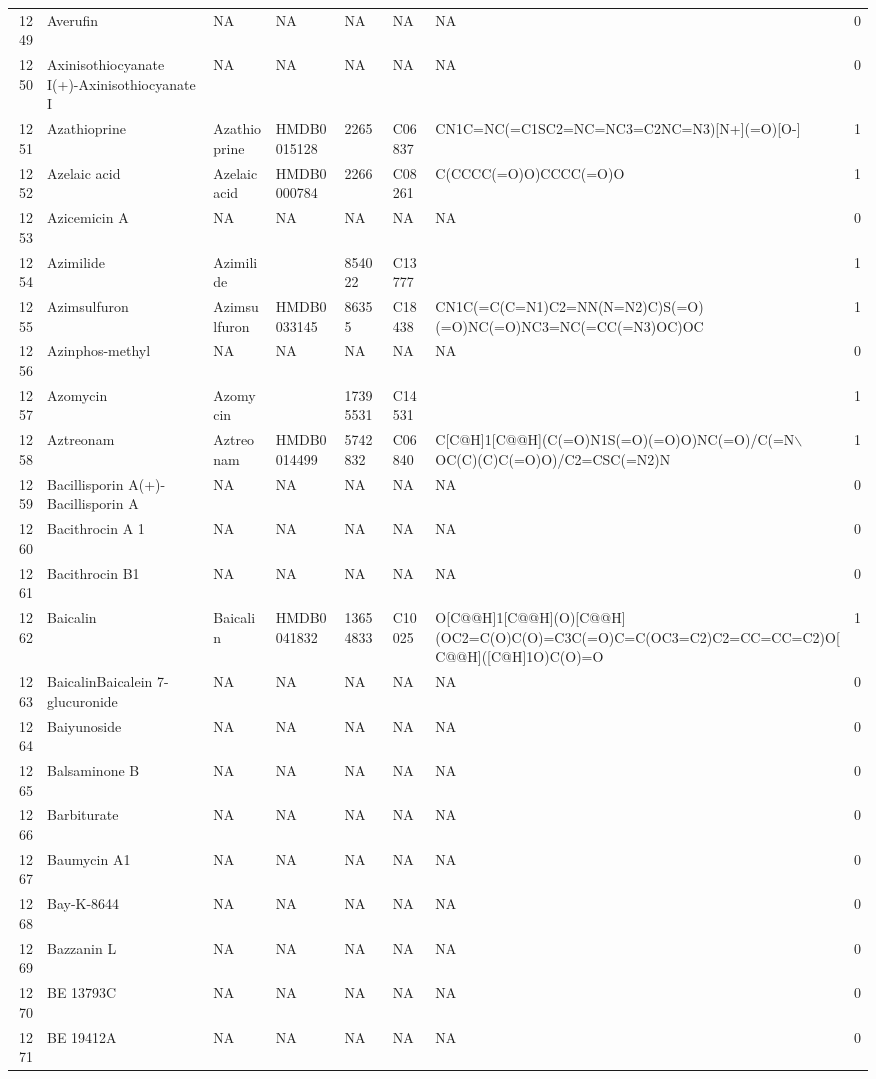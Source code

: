 \documentclass[a4paper]{article}
\begin{document}
\begin{longtable}{rlllllll}
  1249 & Averufin & NA & NA & NA & NA & NA & 0 \\ 
  1250 & Axinisothiocyanate I(+)-Axinisothiocyanate I & NA & NA & NA & NA & NA & 0 \\ 
  1251 & Azathioprine & Azathioprine & HMDB0015128 & 2265 & C06837 & CN1C=NC(=C1SC2=NC=NC3=C2NC=N3)[N+](=O)[O-] & 1 \\ 
  1252 & Azelaic acid & Azelaic acid & HMDB0000784 & 2266 & C08261 & C(CCCC(=O)O)CCCC(=O)O & 1 \\ 
  1253 & Azicemicin A & NA & NA & NA & NA & NA & 0 \\ 
  1254 & Azimilide & Azimilide &  & 854022 & C13777 &  & 1 \\ 
  1255 & Azimsulfuron & Azimsulfuron & HMDB0033145 & 86355 & C18438 & CN1C(=C(C=N1)C2=NN(N=N2)C)S(=O)(=O)NC(=O)NC3=NC(=CC(=N3)OC)OC & 1 \\ 
  1256 & Azinphos-methyl & NA & NA & NA & NA & NA & 0 \\ 
  1257 & Azomycin & Azomycin &  & 17395531 & C14531 &  & 1 \\ 
  1258 & Aztreonam & Aztreonam & HMDB0014499 & 5742832 & C06840 & C[C@H]1[C@@H](C(=O)N1S(=O)(=O)O)NC(=O)/C(=N$\backslash$OC(C)(C)C(=O)O)/C2=CSC(=N2)N & 1 \\ 
  1259 & Bacillisporin A(+)-Bacillisporin A & NA & NA & NA & NA & NA & 0 \\ 
  1260 & Bacithrocin A 1 & NA & NA & NA & NA & NA & 0 \\ 
  1261 & Bacithrocin B1 & NA & NA & NA & NA & NA & 0 \\ 
  1262 & Baicalin & Baicalin & HMDB0041832 & 13654833 & C10025 & O[C@@H]1[C@@H](O)[C@@H](OC2=C(O)C(O)=C3C(=O)C=C(OC3=C2)C2=CC=CC=C2)O[C@@H]([C@H]1O)C(O)=O & 1 \\ 
  1263 & BaicalinBaicalein 7-glucuronide & NA & NA & NA & NA & NA & 0 \\ 
  1264 & Baiyunoside & NA & NA & NA & NA & NA & 0 \\ 
  1265 & Balsaminone B & NA & NA & NA & NA & NA & 0 \\ 
  1266 & Barbiturate & NA & NA & NA & NA & NA & 0 \\ 
  1267 & Baumycin A1 & NA & NA & NA & NA & NA & 0 \\ 
  1268 & Bay-K-8644 & NA & NA & NA & NA & NA & 0 \\ 
  1269 & Bazzanin L & NA & NA & NA & NA & NA & 0 \\ 
  1270 & BE 13793C & NA & NA & NA & NA & NA & 0 \\ 
  1271 & BE 19412A & NA & NA & NA & NA & NA & 0 \\ 

\end{longtable}
\end{document}

